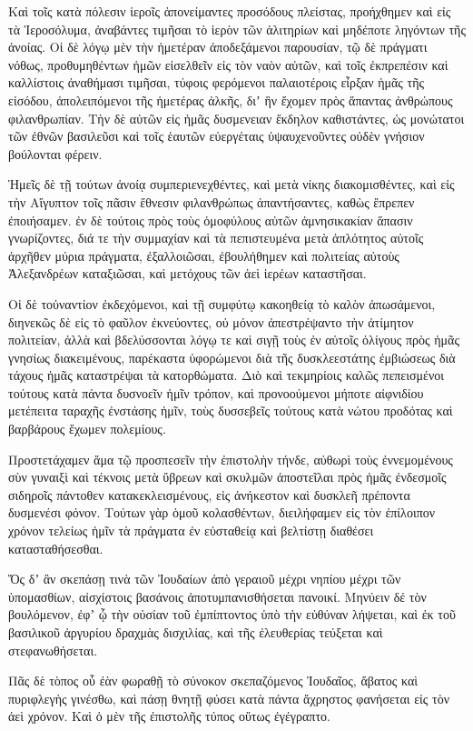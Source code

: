 {\par }{\PP {}Καὶ τοῖς κατὰ πόλεσιν ἱεροῖς ἀπονείμαντες προσόδους πλείστας, προήχθημεν καὶ εἰς τὰ Ἰεροσόλυμα, ἀναβάντες τιμῆσαι τὸ ἱερὸν τῶν ἀλιτηρίων καὶ μηδέποτε ληγόντων τῆς ἀνοίας.
Οἱ δὲ λόγῳ μὲν τὴν ἡμετέραν ἀποδεξάμενοι παρουσίαν, τῷ δὲ πράγματι νόθως, προθυμηθέντων ἡμῶν εἰσελθεῖν εἰς τὸν ναὸν αὐτῶν, καὶ τοῖς ἐκπρεπέσιν καὶ καλλίστοις ἀναθήμασι τιμῆσαι,
τύφοις φερόμενοι παλαιοτέροις εἶρξαν ἡμᾶς τῆς εἰσόδου, ἀπολειπόμενοι τῆς ἡμετέρας ἀλκῆς, διʼ ἣν ἔχομεν πρὸς ἅπαντας ἀνθρώπους φιλανθρωπίαν.
Τὴν δὲ αὐτῶν εἰς ἡμᾶς δυσμενειαν ἔκδηλον καθιστάντες, ὡς μονώτατοι τῶν ἐθνῶν βασιλεῦσι καὶ τοῖς ἑαυτῶν εὐεργέταις ὑψαυχενοῦντες οὐδὲν γνήσιον βούλονται φέρειν.
\par }{\PP {}Ἡμεῖς δὲ τῇ τούτων ἀνοίᾳ συμπεριενεχθέντες, καὶ μετὰ νίκης διακομισθέντες, καὶ εἰς τὴν Αἴγυπτον τοῖς πᾶσιν ἔθνεσιν φιλανθρώπως ἀπαντήσαντες, καθὼς ἔπρεπεν ἐποιήσαμεν.
ἐν δὲ τούτοις πρὸς τοὺς ὁμοφύλους αὐτῶν ἀμνησικακίαν ἅπασιν γνωρίζοντες, διά τε τὴν συμμαχίαν καὶ τὰ πεπιστευμένα μετὰ ἁπλότητος αὐτοῖς ἀρχῆθεν μύρια πράγματα, ἐξαλλοιῶσαι, ἐβουλήθημεν καὶ πολιτείας αὐτοὺς Ἀλεξανδρέων καταξιῶσαι, καὶ μετόχους τῶν ἀεὶ ἱερέων καταστῆσαι.
\par }{\PP {}Οἱ δὲ τοὐναντίον ἐκδεχόμενοι, καὶ τῇ συμφύτῳ κακοηθείᾳ τὸ καλὸν ἀπωσάμενοι, διηνεκῶς δὲ εἰς τὸ φαῦλον ἐκνεύοντες,
οὐ μόνον ἀπεστρέψαντο τὴν ἀτίμητον πολιτείαν, ἀλλὰ καὶ βδελύσσονται λόγῳ τε καὶ σιγῇ τοὺς ἐν αὐτοῖς ὀλίγους πρὸς ἡμᾶς γνησίως διακειμένους, παρέκαστα ὑφορώμενοι διὰ τῆς δυσκλεεστάτης ἐμβιώσεως διὰ τάχους ἡμᾶς καταστρέψαι τὰ κατορθώματα.
Διὸ καὶ τεκμηρίοις καλῶς πεπεισμένοι τούτους κατὰ πάντα δυσνοεῖν ἡμῖν τρόπον, καὶ προνοούμενοι μήποτε αἰφνιδίου μετέπειτα ταραχῆς ἐνστάσης ἡμῖν, τοὺς δυσσεβεῖς τούτους κατὰ νώτου προδότας καὶ βαρβάρους ἔχωμεν πολεμίους.
\par }{\PP {}Προστετάχαμεν ἅμα τῷ προσπεσεῖν τὴν ἐπιστολὴν τήνδε, αὐθωρὶ τοὺς ἐννεμομένους σὺν γυναιξὶ καὶ τέκνοις μετὰ ὕβρεων καὶ σκυλμῶν ἀποστεῖλαι πρὸς ἡμᾶς ἐνδεσμοῖς σιδηροῖς πάντοθεν κατακεκλεισμένους, εἰς ἀνήκεστον καὶ δυσκλεῆ πρέποντα δυσμενέσι φόνον.
Τούτων γὰρ ὁμοῦ κολασθέντων, διειλήφαμεν εἰς τὸν ἐπίλοιπον χρόνον τελείως ἡμῖν τὰ πράγματα ἐν εὐσταθείᾳ καὶ βελτίστῃ διαθέσει κατασταθήσεσθαι.
\par }{\PP {}Ὅς δʼ ἂν σκεπάσῃ τινὰ τῶν Ἰουδαίων ἀπὸ γεραιοῦ μέχρι νηπίου μέχρι τῶν ὑπομασθίων, αἰσχίστοις βασάνοις ἀποτυμπανισθήσεται πανοικί.
Μηνύειν δέ τὸν βουλόμενον, ἐφʼ ᾧ τὴν οὐσίαν τοῦ ἐμπίπτοντος ὑπὸ τὴν εὐθύναν λήψεται, καὶ ἐκ τοῦ βασιλικοῦ ἀργυρίου δραχμὰς δισχιλίας, καὶ τῆς ἐλευθερίας τεύξεται καὶ στεφανωθήσεται.
\par }{\PP {}Πᾶς δὲ τὸπος οὗ ἐὰν φωραθῇ τὸ σύνοκον σκεπαζόμενος Ἰουδαῖος, ἄβατος καὶ πυριφλεγὴς γινέσθω, καὶ πάσῃ θνητῇ φύσει κατὰ πάντα ἄχρηστος φανήσεται εἰς τὸν ἀεὶ χρόνον.
Καὶ ὁ μὲν τῆς ἐπιστολῆς τύπος οὕτως ἐγέγραπτο.

}
